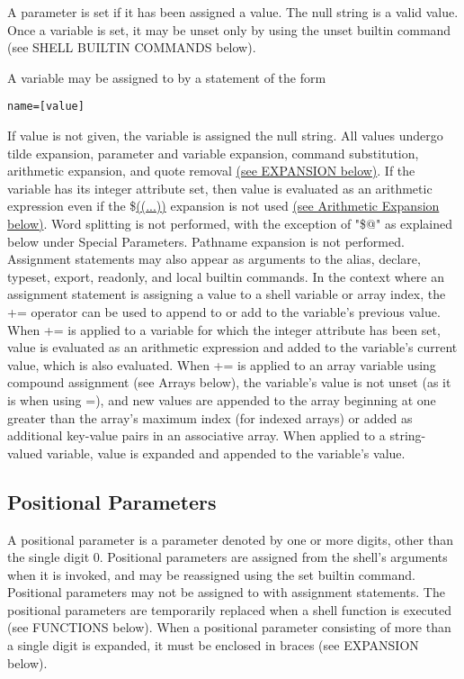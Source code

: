 \documentclass[11pt]{article}
\begin{document}
A parameter is set if it has been assigned a value. The null string is a valid value. Once a variable is set, it may be unset only by using the unset builtin command (see SHELL BUILTIN COMMANDS below).

A variable may be assigned to by a statement of the form

\begin{lstlisting}
name=[value]
\end{lstlisting}

If value is not given, the variable is assigned the null string. All values undergo tilde expansion, parameter and variable expansion, command substitution, arithmetic expansion, and quote removal \hyperref[sec:expansion]{(see EXPANSION below)}. If the variable has its integer attribute set, then value is evaluated as an arithmetic expression even if the \$\url{((...))} %
expansion is not used \hyperref[sec:arithmeticexpansion]{(see Arithmetic Expansion below)}. Word splitting is not performed, with the exception of "\$@" as explained below under Special Parameters. Pathname expansion is not performed. Assignment statements may also appear as arguments to the alias, declare, typeset, export, readonly, and local builtin commands.
In the context where an assignment statement is assigning a value to a shell variable or array index, the += operator can be used to append to or add to the variable's previous value. When += is applied to a variable for which the integer attribute has been set, value is evaluated as an arithmetic expression and added to the variable's current value, which is also evaluated. When += is applied to an array variable using compound assignment (see Arrays below), the variable's value is not unset (as it is when using =), and new values are appended to the array beginning at one greater than the array's maximum index (for indexed arrays) or added as additional key-value pairs in an associative array. When applied to a string-valued variable, value is expanded and appended to the variable's value.

\subsection{Positional Parameters}\label{sec:positionalparameters}

A positional parameter is a parameter denoted by one or more digits, other than the single digit 0. Positional parameters are assigned from the shell's arguments when it is invoked, and may be reassigned using the set builtin command. Positional parameters may not be assigned to with assignment statements. The positional parameters are temporarily replaced when a shell function is executed (see FUNCTIONS below).
When a positional parameter consisting of more than a single digit is expanded, it must be enclosed in braces (see EXPANSION below).
\end{document}
